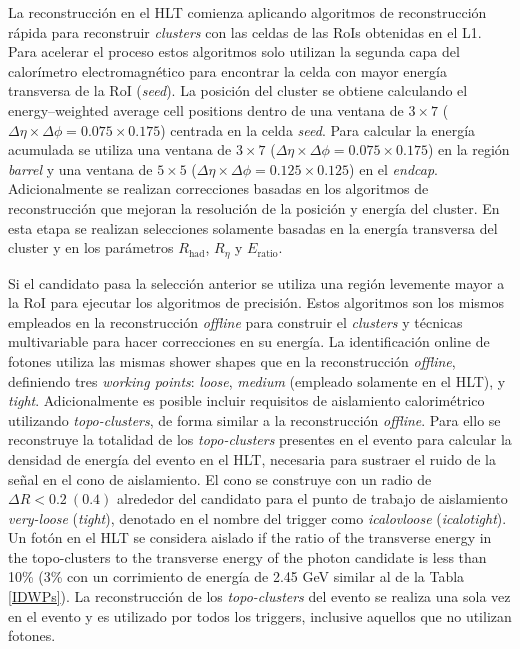 La reconstrucción en el HLT comienza aplicando algoritmos de reconstrucción rápida para reconstruir \textit{clusters} con las celdas de las RoIs obtenidas en el L1. Para acelerar el proceso estos algoritmos solo utilizan la segunda capa del calorímetro electromagnético para encontrar la celda con mayor energía transversa de la RoI (\textit{seed}). La posición del cluster se obtiene calculando el energy–weighted average cell positions 
dentro de una ventana de $3\times7$ ($\Delta\eta\times\Delta\phi = 0.075\times0.175$) centrada en la celda \textit{seed}. Para calcular la energía acumulada 
se utiliza una ventana de $3\times7$ ($\Delta\eta\times\Delta\phi = 0.075\times0.175$) en la región \textit{barrel} y una ventana de $5\times5$ ($\Delta\eta\times\Delta\phi = 0.125\times0.125$) en el \textit{endcap}. Adicionalmente se realizan correcciones basadas en los algoritmos de reconstrucción que mejoran la resolución de la posición y energía del cluster. En esta etapa se realizan selecciones solamente basadas en la energía transversa del cluster y en los parámetros $R_{\text{had}}$, $R_{\eta}$ y $E_{\text{ratio}}$.


Si el candidato pasa la selección anterior se utiliza una región levemente mayor a la RoI para ejecutar los algoritmos de precisión. Estos algoritmos son los mismos empleados en la reconstrucción \textit{offline} \cite{Lampl:1099735} para construir el \textit{clusters} y técnicas multivariable \cite{PERF-2017-03} para hacer correcciones en su energía. La identificación online de fotones utiliza las mismas shower shapes que en la reconstrucción \textit{offline}, definiendo tres \textit{working points}: \textit{loose}, \textit{medium} (empleado solamente en el HLT), y \textit{tight}.
Adicionalmente es posible incluir requisitos de aislamiento calorimétrico utilizando \textit{topo-clusters}, de forma similar a la reconstrucción \textit{offline}. Para ello se reconstruye la totalidad de los \textit{topo-clusters} presentes en el evento para calcular la densidad de energía del evento en el HLT, necesaria para sustraer el ruido de la señal en el cono de aislamiento. El cono se construye con un radio de  $\Delta R < 0.2\:(0.4)$ alrededor del candidato para el punto de trabajo de aislamiento \textit{very-loose} (\textit{tight}), denotado en el nombre del trigger como \textit{icalovloose} (\textit{icalotight}). Un fotón en el HLT se considera aislado if the ratio of the transverse energy in the topo-clusters to the transverse energy of the photon candidate is less than 
10\% (3\% con un corrimiento de energía de 2.45 GeV similar al de la Tabla \ref{IDWPs}). La reconstrucción de los \textit{topo-clusters} del evento se realiza una sola vez en el evento y es utilizado por todos los triggers, inclusive aquellos que no utilizan fotones.


